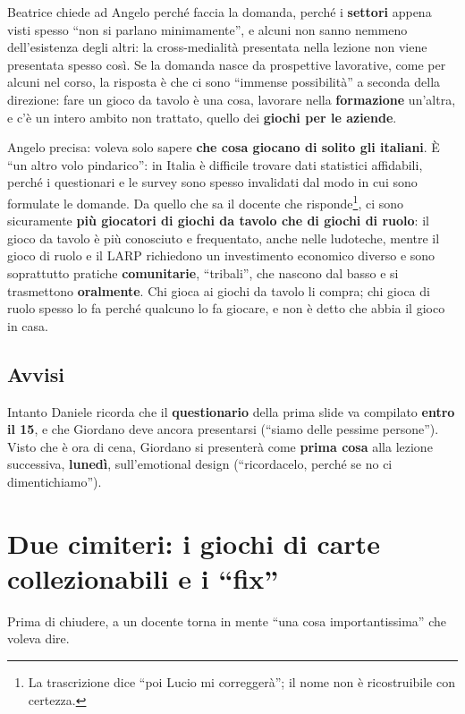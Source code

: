 Beatrice chiede ad Angelo perché faccia la domanda, perché i \textbf{settori}
appena visti spesso ``non si parlano minimamente'', e alcuni non sanno nemmeno
dell'esistenza degli altri: la cross-medialità presentata nella lezione non viene
presentata spesso così. Se la domanda nasce da prospettive lavorative, come per
alcuni nel corso, la risposta è che ci sono ``immense possibilità'' a seconda
della direzione: fare un gioco da tavolo è una cosa, lavorare nella
\textbf{formazione} un'altra, e c'è un intero ambito non trattato, quello dei
\textbf{giochi per le aziende}.

Angelo precisa: voleva solo sapere \textbf{che cosa giocano di solito gli
italiani}. È ``un altro volo pindarico'': in Italia è difficile trovare dati
statistici affidabili, perché i questionari e le survey sono spesso invalidati
dal modo in cui sono formulate le domande. Da quello che sa il docente che risponde\footnote{La trascrizione dice ``poi Lucio mi correggerà''; il nome non è ricostruibile con certezza.}, ci sono sicuramente \textbf{più giocatori di giochi da
tavolo che di giochi di ruolo}: il gioco da tavolo è più conosciuto e
frequentato, anche nelle ludoteche, mentre il gioco di ruolo e il LARP richiedono
un investimento economico diverso e sono soprattutto pratiche
\textbf{comunitarie}, ``tribali'', che nascono dal basso e si trasmettono
\textbf{oralmente}. Chi gioca ai giochi da tavolo li compra; chi gioca di ruolo
spesso lo fa perché qualcuno lo fa giocare, e non è detto che abbia il gioco in
casa.

\subsection{Avvisi}

Intanto Daniele ricorda che il \textbf{questionario} della prima slide va
compilato \textbf{entro il 15}, e che Giordano deve ancora presentarsi (``siamo
delle pessime persone''). Visto che è ora di cena, Giordano si presenterà come
\textbf{prima cosa} alla lezione successiva, \textbf{lunedì}, sull'emotional
design (``ricordacelo, perché se no ci dimentichiamo'').

\section{Due cimiteri: i giochi di carte collezionabili e i ``fix''}
\label{a2:sec:cimiteri}

Prima di chiudere, a un docente torna in mente ``una cosa importantissima''
che voleva dire.

